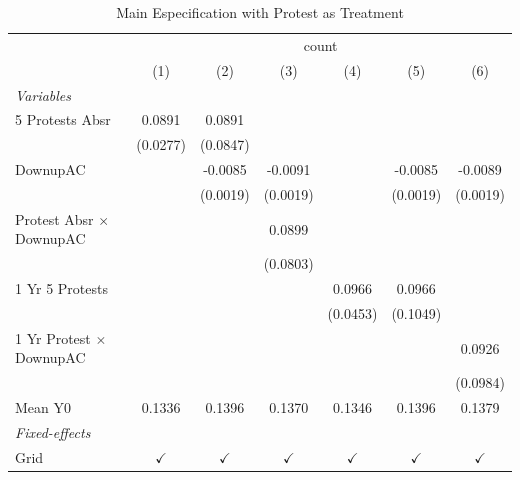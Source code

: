 
\begin{table}[htbp]
   \caption{\label{tab:protest_treat_main} Main Especification with Protest as Treatment}
   \centering
   \begin{tabular}{lcccccc}
      \tabularnewline \midrule \midrule
       & \multicolumn{6}{c}{count}\\
                                       & (1)           & (2)           & (3)           & (4)           & (5)           & (6)\\  
      \midrule
      \emph{Variables}\\
      5 Protests Absr                  & 0.0891        & 0.0891        &               &               &               &   \\   
                                       & (0.0277)      & (0.0847)      &               &               &               &   \\   
      DownupAC                         &               & -0.0085       & -0.0091       &               & -0.0085       & -0.0089\\   
                                       &               & (0.0019)      & (0.0019)      &               & (0.0019)      & (0.0019)\\   
      Protest Absr $\times$ DownupAC   &               &               & 0.0899        &               &               &   \\   
                                       &               &               & (0.0803)      &               &               &   \\   
      1 Yr 5 Protests                  &               &               &               & 0.0966        & 0.0966        &   \\   
                                       &               &               &               & (0.0453)      & (0.1049)      &   \\   
      1 Yr Protest $\times$ DownupAC   &               &               &               &               &               & 0.0926\\   
                                       &               &               &               &               &               & (0.0984)\\   
      Mean Y0                          & 0.1336        & 0.1396        & 0.1370        & 0.1346        & 0.1396        & 0.1379\\  
      \midrule
      \emph{Fixed-effects}\\
      Grid                             & $\checkmark$  & $\checkmark$  & $\checkmark$  & $\checkmark$  & $\checkmark$  & $\checkmark$\\   

\end{tabular}
\end{table}
